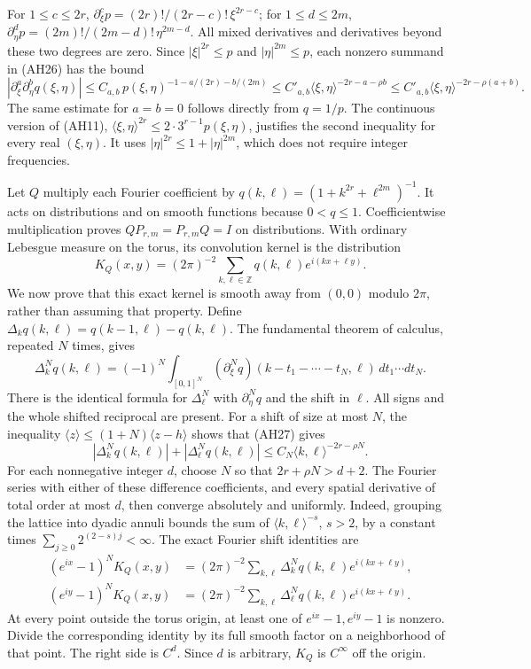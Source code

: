 \documentclass[
  11pt,
]{article}
\begin{document}
For \(1\leq c\leq2r\), \(\partial_\xi^c p=(2r)!/(2r-c)!\,\xi^{2r-c}\);
for \(1\leq d\leq2m\), \(\partial_\eta^d p=(2m)!/(2m-d)!\,\eta^{2m-d}\).
All mixed derivatives and derivatives beyond these two degrees are zero.
Since \(|\xi|^{2r}\leq p\) and \(|\eta|^{2m}\leq p\), each nonzero
summand in (AH26) has the bound \[
 |\partial_\xi^a\partial_\eta^b q(\xi,\eta)|
 \leq C_{a,b}\,p(\xi,\eta)^{-1-a/(2r)-b/(2m)}
 \leq C'_{a,b}\langle\xi,\eta\rangle^{-2r-a-\rho b}
 \leq C'_{a,b}\langle\xi,\eta\rangle^{-2r-\rho(a+b)} .
 \tag{AH27}
\] The same estimate for \(a=b=0\) follows directly from \(q=1/p\). The
continuous version of (AH11),
\(\langle\xi,\eta\rangle^{2r}\leq2\cdot3^{r-1}p(\xi,\eta)\), justifies
the second inequality for every real \((\xi,\eta)\). It uses
\(|\eta|^{2r}\leq1+|\eta|^{2m}\), which does not require integer
frequencies.

Let \(Q\) multiply each Fourier coefficient by
\(q(k,\ell)=(1+k^{2r}+\ell^{2m})^{-1}\). It acts on distributions and on
smooth functions because \(0<q\leq1\). Coefficientwise multiplication
proves \(QP_{r,m}=P_{r,m}Q=I\) on distributions. With ordinary Lebesgue
measure on the torus, its convolution kernel is the distribution \[
 K_Q(x,y)=(2\pi)^{-2}
       \sum_{k,\ell\in\mathbb Z}q(k,\ell)e^{i(kx+\ell y)} .
 \tag{AH28}
\] We now prove that this exact kernel is smooth away from \((0,0)\)
modulo \(2\pi\), rather than assuming that property. Define
\(\Delta_k q(k,\ell)=q(k-1,\ell)-q(k,\ell)\). The fundamental theorem of
calculus, repeated \(N\) times, gives \[
 \Delta_k^N q(k,\ell)
 =(-1)^N\int_{[0,1]^N}
       (\partial_\xi^Nq)(k-t_1-\cdots-t_N,\ell)\,dt_1\cdots dt_N .
 \tag{AH29}
\] There is the identical formula for \(\Delta_\ell^N\) with
\(\partial_\eta^Nq\) and the shift in \(\ell\). All signs and the whole
shifted reciprocal are present. For a shift of size at most \(N\), the
inequality \(\langle z\rangle\leq(1+N)\langle z-h\rangle\) shows that
(AH27) gives \[
 |\Delta_k^N q(k,\ell)|+|\Delta_\ell^N q(k,\ell)|
       \leq C_N\langle k,\ell\rangle^{-2r-\rho N}.
 \tag{AH30}
\] For each nonnegative integer \(d\), choose \(N\) so that
\(2r+\rho N>d+2\). The Fourier series with either of these difference
coefficients, and every spatial derivative of total order at most \(d\),
then converge absolutely and uniformly. Indeed, grouping the lattice
into dyadic annuli bounds the sum of \(\langle k,\ell\rangle^{-s}\),
\(s>2\), by a constant times \(\sum_{j\geq0}2^{(2-s)j}<\infty\). The
exact Fourier shift identities are \[
 \begin{aligned}
 (e^{ix}-1)^N K_Q(x,y)
   &=(2\pi)^{-2}\sum_{k,\ell}\Delta_k^Nq(k,\ell)e^{i(kx+\ell y)},\\
 (e^{iy}-1)^N K_Q(x,y)
   &=(2\pi)^{-2}\sum_{k,\ell}\Delta_\ell^Nq(k,\ell)e^{i(kx+\ell y)}.
 \end{aligned}
 \tag{AH31}
\] At every point outside the torus origin, at least one of
\(e^{ix}-1,e^{iy}-1\) is nonzero. Divide the corresponding identity by
its full smooth factor on a neighborhood of that point. The right side
is \(C^d\). Since \(d\) is arbitrary, \(K_Q\) is \(C^\infty\) off the
origin.
\end{document}
